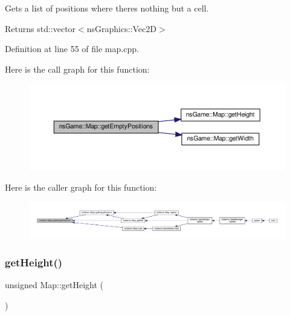 Gets a list of positions where there\textquotesingle{}s nothing but a cell. 

\begin{DoxyReturn}{Returns}
std\+::vector$<$ns\+Graphics\+::\+Vec2\+D$>$ 
\end{DoxyReturn}


Definition at line 55 of file map.\+cpp.

Here is the call graph for this function\+:\nopagebreak
\begin{figure}[H]
\begin{center}
\leavevmode
\includegraphics[width=350pt]{classns_game_1_1_map_a098dda0872f84fa83c61693efaca48f1_cgraph}
\end{center}
\end{figure}
Here is the caller graph for this function\+:\nopagebreak
\begin{figure}[H]
\begin{center}
\leavevmode
\includegraphics[width=350pt]{classns_game_1_1_map_a098dda0872f84fa83c61693efaca48f1_icgraph}
\end{center}
\end{figure}
\mbox{\label{classns_game_1_1_map_a8ae7e6fe93f1318c0d7d2569e73ec144}} 
\subsubsection{\texorpdfstring{get\+Height()}{getHeight()}}
{\footnotesize\ttfamily unsigned Map\+::get\+Height (\begin{DoxyParamCaption}{ }\end{DoxyParamCaption})}



